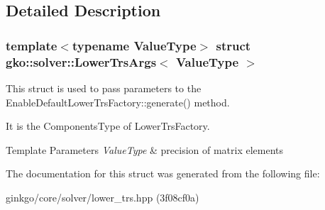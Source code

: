 \subsection{Detailed Description}
\subsubsection*{template$<$typename Value\+Type$>$\newline
struct gko\+::solver\+::\+Lower\+Trs\+Args$<$ Value\+Type $>$}

This struct is used to pass parameters to the Enable\+Default\+Lower\+Trs\+Factory\+::generate() method. 

It is the Components\+Type of Lower\+Trs\+Factory.


\begin{DoxyTemplParams}{Template Parameters}
{\em Value\+Type} & precision of matrix elements \\
\hline
\end{DoxyTemplParams}


The documentation for this struct was generated from the following file\+:\begin{DoxyCompactItemize}
\item 
ginkgo/core/solver/lower\+\_\+trs.\+hpp (3f08cf0a)\end{DoxyCompactItemize}
